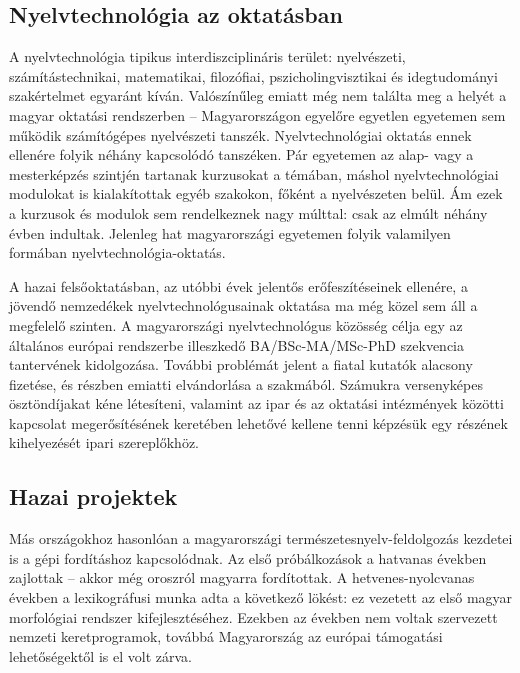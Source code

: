 \begin{multicols}{2}
  \subsection{Nyelvtechnológia az oktatásban}

  A nyelvtechnológia tipikus in\-ter\-disz\-cip\-li\-ná\-ris terület: nyelvészeti, számítástechnikai, matematikai, filozófiai, pszi\-cho\-ling\-visz\-ti\-kai és idegtudományi szakértelmet egyaránt kíván. Valószínűleg emiatt még nem találta meg a helyét a ma\-gyar oktatási rendszerben -- Magyarországon egyelőre egyetlen egyetemen sem működik számítógépes nyelvészeti tanszék. Nyelvtechnológiai oktatás ennek ellenére folyik néhány kapcsolódó tanszéken. Pár egyetemen az alap- vagy a mesterképzés szintjén tartanak kurzusokat a témában, máshol nyelvtechnológiai modulokat is kialakítottak egyéb szakokon, főként a nyelvészeten belül. Ám ezek a kurzusok és modulok sem rendelkeznek nagy múlttal: csak az elmúlt néhány évben indultak. Jelenleg hat ma\-gyar\-or\-szá\-gi egyetemen folyik valamilyen formában nyelvtechnológia-oktatás.

  A hazai felsőoktatásban, az utóbbi évek jelentős erőfeszítéseinek ellenére, a jö\-ven\-dő nemzedékek nyelvtechnológusainak oktatása ma még közel sem áll a megfelelő szinten. A magyarországi nyelvtechnológus közösség célja egy az általános európai rendszerbe illeszkedő BA/BSc-MA/MSc-PhD szekvencia tantervének kidolgozása. További problémát jelent a fiatal kutatók alacsony fizetése, és részben emiatti elvándorlása a szakmából. Számukra versenyképes ösztöndíjakat kéne létesíteni, valamint az ipar és az oktatási intézmények közötti kapcsolat meg\-erő\-sí\-té\-sé\-nek keretében lehetővé kellene tenni képzésük egy részének kihelyezését ipari szereplőkhöz. 

  \subsection{Hazai projektek}

  Más országokhoz hasonlóan a ma\-gyar\-or\-szá\-gi természetesnyelv-feldolgozás kezdetei is a gépi fordításhoz kapcsolódnak. Az első próbálkozások a hatvanas években zajlottak -- akkor még oroszról ma\-gyar\-ra fordítottak. A hetvenes-nyolcvanas években a lexikográfusi munka adta a következő lökést: ez vezetett az első ma\-gyar morfológiai rendszer kifejlesztéséhez. Ezekben az években nem voltak szervezett nemzeti keretprogramok, továbbá Ma\-gyar\-or\-szág az európai támogatási le\-he\-tő\-sé\-gek\-től is el volt zárva.  


\end{multicols}
